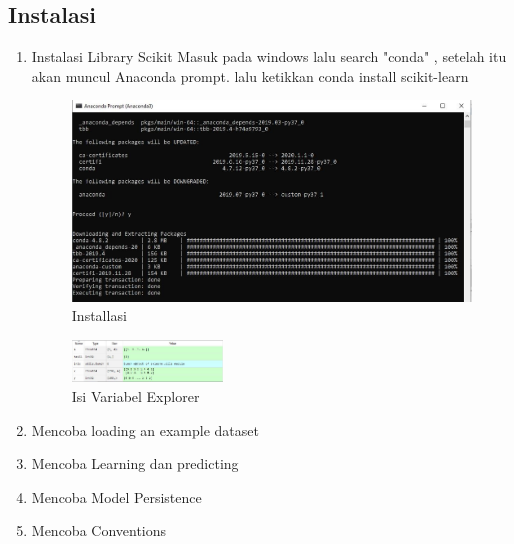 \subsection{Instalasi}
\begin{enumerate}
\item {Instalasi Library Scikit}
Masuk pada windows lalu search "conda" , setelah itu akan muncul Anaconda prompt. lalu ketikkan conda install scikit-learn
\begin{figure}[ht]
\centering
\includegraphics[scale=0.5]{figures/1174056/1/1.JPG}
\caption{Installasi}
\label{contoh}
\end{figure}
\begin{figure}[H]
\centering
\includegraphics[width=4cm]{figures/1174056/1/2.JPG}
\caption{Isi Variabel Explorer}
\end{figure}
\item Mencoba loading an example dataset
\hfill\break

\item Mencoba Learning dan predicting
\hfill\break

\item Mencoba Model Persistence
\hfill\break

\item Mencoba Conventions
\hfill\break

\end{enumerate}
